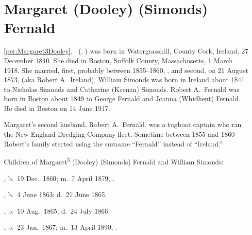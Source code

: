 \section{Margaret (Dooley) (Simonds) Fernald}

\ref{per:Margaret3Dooley}.\  (, ) was born in Watergrasshill, County Cork, Ireland, 27 December 1840.\cite{Margaret3DooleyBaptism} She died in Boston, Suffolk County, Massachusetts, 1 March 1918.\cite{Margaret3DooleyDeath} She married, first, probably between 1855--1860, ,\cite{WilliamSimondsMarriage} and second, on 21 August 1873, \cite{RobertFernaldMarriage} (aka Robert A.\ Ireland).\cite{Census1855RobertFernald} William Simonds was born in Ireland about 1841\cite{Census1855WilliamSimonds} to Nicholas Simonds and Catharine (Keenan) Simonds.\cite{WilliamSimondsDeath,CatharineSimondsDeath} Robert A.\ Fernald was born in Boston about 1849 to George Fernald and Joanna (Whidhent) Fernald.\cite{RobertFernaldMarriage,JoannaFernaldDeath} He died in Boston on 14 June 1917.\cite{RobertFernaldDeath}

Margaret's second husband, Robert A.\ Fernald, was a tugboat captain who ran the New England Dredging Company fleet.\cite{RobertFernaldDeath} Sometime between 1855 and 1860 Robert's family started using the surname ``Fernald'' instead of ``Ireland.''\cite{Census1855RobertFernald,Census1860RobertFernald}

\begin{KidsIntro}
	Children of Margaret\textsuperscript{3} (Dooley) (Simonds) Fernald and William Simonds:
\end{KidsIntro}

\begin{Kids}
	
	, b.\ 19 Dec.\ 1860; m.\ 7 April 1879, .
	
	, b.\ 4 June 1863;\cite{Francis4SimondsBirth} d.\ 27 June 1865.\cite{Francis4SimondsDeath}
	
	, b.\ 10 Aug.\ 1865;\cite{Margaret4SimondsBirth} d.\ 24 July 1866.\cite{Margaret4SimondsDeath}
	
	, b.\ 23 Jan.\ 1867; m.\ 13 April 1890, .

\end{Kids}
	
